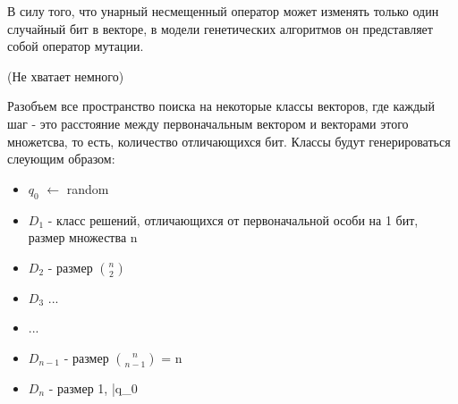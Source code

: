 \label{unary}

В силу того, что унарный несмещенный оператор может изменять только один случайный бит в векторе, в модели генетических алгоритмов он представляет собой оператор мутации. 

(Не хватает немного)

Разобъем все пространство поиска на некоторые классы векторов, где каждый шаг - это расстояние между первоначальным вектором и векторами этого множетсва, то есть, количество отличающихся бит. Классы будут генерироваться слеующим образом: 
\begin{itemize}
   \item $q_0$ $\leftarrow$ random
   \item $D_1$ - класс решений, отличающихся от первоначальной особи на 1 бит, размер множества n
   \item $D_2$ - размер ${n}\choose{2}$
   \item $D_3$ ...
   \item ...
   \item $D_{n-1}$ - размер ${n}\choose{n - 1}$ = n
   \item $D_n$ - размер 1, \bar{q_0}
\end{itemize} 


